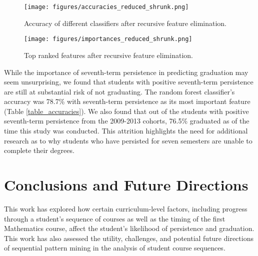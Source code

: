 \documentclass[conference]{IEEEtran}
\begin{document}
\begin{figure}[htbp]
\centering
\texttt{[image: figures/accuracies\_reduced\_shrunk.png]}
\caption{Accuracy of different classifiers after recursive feature elimination.}
\label{accuracies_reduced}
\end{figure}

\begin{figure}[htbp]
\centering
\texttt{[image: figures/importances\_reduced\_shrunk.png]}
\caption{Top ranked features after recursive feature elimination.}
\label{importances_reduced}
\end{figure}
While the importance of seventh-term persistence in predicting graduation may seem unsurprising, we found that students with positive seventh-term persistence are still at substantial risk of not graduating.  The random forest classifier's accuracy was 78.7\% with seventh-term persistence as its most important feature (Table \ref{table_accuracies}).  We also found that out of the students with positive seventh-term persistence from the 2009-2013 cohorts, 76.5\% graduated as of the time this study was conducted. This attrition highlights the need for additional research as to why students who have persisted for seven semesters are unable to complete their degrees. 

\section{Conclusions and Future Directions}

This work has explored how certain curriculum-level factors, including progress through a student's sequence of courses as well as the timing of the first Mathematics course, affect the student's likelihood of persistence and graduation.  This work has also assessed the utility, challenges, and potential future directions of sequential pattern mining in the analysis of student course sequences.
\end{document}

